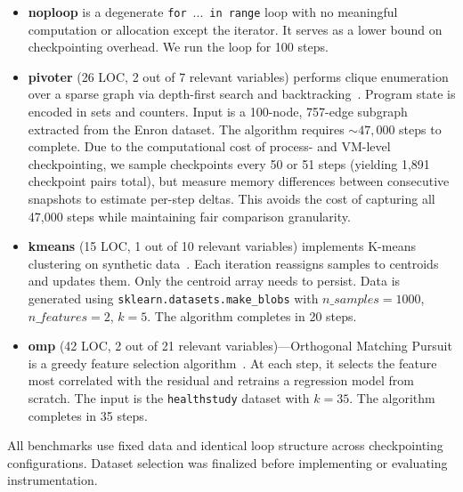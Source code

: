 \begin{itemize}[leftmargin=*]
    \item \textbf{noploop} is a degenerate  {\color{blue!50!black}
\texttt{for}~\textrm{...}~\texttt{in}~\texttt{range}} loop with no meaningful computation or allocation except the iterator. It serves as a lower bound on checkpointing overhead. We run the loop for 100 steps.

    \item \textbf{pivoter} (26 LOC, 2 out of 7 relevant variables) performs clique enumeration over a sparse graph via depth-first search and backtracking~\cite{jain2020power}. Program state is encoded in sets and counters. Input is a 100-node, 757-edge subgraph extracted from the Enron dataset. The algorithm requires $\sim 47,000$ steps to complete. Due to the computational cost of process- and VM-level checkpointing, we sample checkpoints every 50 or 51 steps (yielding 1,891 checkpoint pairs total), but measure memory differences between consecutive snapshots to estimate per-step deltas. This avoids the cost of capturing all 47,000 steps while maintaining fair comparison granularity.

    \item \textbf{kmeans} (15 LOC, 1 out of 10 relevant variables) implements K-means clustering on synthetic data~\cite{macqueen1967multivariate}. Each iteration reassigns samples to centroids and updates them. Only the centroid array needs to persist. Data is generated using \texttt{sklearn.datasets.make\_blobs} with $\textit{n\_samples}=1000$, $\textit{n\_features}=2$, $k=5$. The algorithm completes in 20 steps.

    \item \textbf{omp} (42 LOC, 2 out of 21 relevant variables)---Orthogonal Matching Pursuit is a greedy feature selection algorithm~\cite{Pati1993OMP, quinzan2022fast}. At each step, it selects the feature most correlated with the residual and retrains a regression model from scratch. The input is the \texttt{healthstudy} dataset with $k = 35$. The algorithm completes in 35 steps.
\end{itemize}

All benchmarks use fixed data and identical loop structure across checkpointing configurations. Dataset selection was finalized before implementing or evaluating instrumentation.

